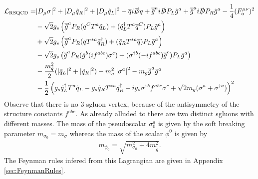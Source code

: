 \begin{align}
\mathcal{L}_{\mathrm{RSQCD}} = & |D_\mu \sigma|^2 + |D_\mu \tilde{q}_R|^2 + |D_\mu \tilde{q}_L|^2 + \overline{q}i\slashed{D}q + \overline{\tilde{g}}^ai\slashed{D}P_L\tilde{g}^a + \overline{\tilde{g}}^ai\slashed{D}P_R\tilde{g}^a - \frac{1}{4} (F_a^{\mu\nu})^2\nonumber\\
& -\sqrt{2}g_s \left( \overline{\tilde{g}}^a P_R (q^C T^a \tilde{q}_L) + (\tilde{q}_L^\dagger T^a \overline{q}^C)P_L\tilde{g}^a \right)\nonumber\\
& +\sqrt{2}g_s \left( \overline{\tilde{g}}^a P_R (q T^{\ast a} \tilde{q}_R^\dagger) + (\tilde{q}_R T^{\ast a} \overline{q})P_L\tilde{g}^a \right) \nonumber\\
& -\sqrt{2}g_s \left( \overline{\tilde{g}}^a P_R (\tilde{g}^b (if^{abc}) \sigma^c) + (\sigma^{\dagger b} (-if^{abc}) \overline{\tilde{g}}^c)P_L\tilde{g}^a \right) \nonumber\\
& -\frac{m_{\tilde{q}}^2}{2}(|\tilde{q}_L|^2 + |\tilde{q}_R|^2) -m_{\sigma}^2\left|\sigma^a\right|^2  - m_g \overline{\tilde{g}}^a\tilde{g}^a\nonumber\\
& -\frac{1}{2}\left( g_s \tilde{q}_L^\dagger T^a \tilde{q}_L - g_s \tilde{q}_R T^{\ast a} \tilde{q}_R^\dagger - ig_s\sigma^{\dagger b}f^{abc}\sigma^c + \sqrt{2}m_g(\sigma^a + \sigma^{\dagger a}) \right)^2\label{eq:L_RSQCD}
\end{align}
Observe that there is no 3 sgluon vertex, because of the antisymmetry of the structure constants $f^{abc}$. As already alluded to there are two distinct sgluons with different masses. The mass of the pseudoscalar $\sigma_0^a$ is given by the soft breaking parameter $m_{\sigma_0} = m_\sigma$ whereas the mass of the scalar $\phi^0$ is given by 
\begin{align}
m_{\phi_0} = \sqrt{m_{\sigma_0}^2 + 4 m_{\tilde{g}}^2}.
\end{align}
The Feynman rules infered from this Lagrangian are given in Appendix \ref{sec:FeynmanRules}.
\newpage
